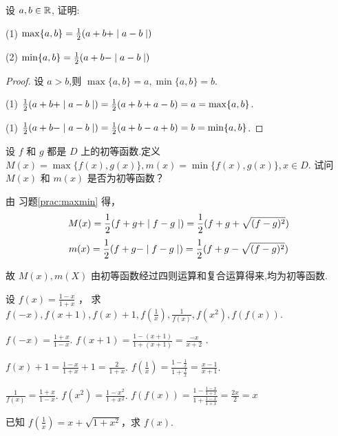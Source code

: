 \chapterhomework

\begin{practice}
    设 $a,b\in \mathbb{R}$, 证明:

    (1) $\max \{a,b\} = \frac{1}{2}(a+b+\mid a-b \mid)$

    (2) $\min \{a,b\} = \frac{1}{2}(a+b-\mid a-b \mid)$
\end{practice}

\begin{proof}
    设 $a>b$,则 $\max \{a,b\}=a,\min \{a,b\} =b$.

    (1) $\frac{1}{2}(a+b+\mid a-b \mid)=\frac{1}{2}(a+b+a-b)=a=\max \{a,b\}$.

    (1) $\frac{1}{2}(a+b-\mid a-b \mid)=\frac{1}{2}(a+b-a+b)=b=\min \{a,b\}$.
\end{proof}

\begin{practice}\label{prac:maxmin}
    设 $f$ 和 $g$ 都是 $D$ 上的初等函数.定义 $M(x)=\max \{f(x),g(x)\},m(x)=\min \{f(x),g(x)\},x\in D$. 试问 $M(x)$ 和 $m(x)$ 是否为初等函数？
\end{practice}

\begin{solve}
    由 习题\ref{prac:maxmin} 得，
\[
    M(x)=\frac{1}{2}(f+g+\mid f-g \mid) = \frac{1}{2}(f+g+\sqrt{(f-g)^2})
\]
\[
    m(x)=\frac{1}{2}(f+g-\mid f-g \mid) = \frac{1}{2}(f+g-\sqrt{(f-g)^2})
\]

故 $M(x),m(X)$ 由初等函数经过四则运算和复合运算得来,均为初等函数.
\end{solve}

\begin{practice}
    设 $f(x)=\frac{1-x}{1+x}$ ， 求 $f(-x),f(x+1),f(x)+1,f(\frac{1}{x}),\frac{1}{f(x)},f(x^2),f(f(x))$.
\end{practice}

\begin{solve}
    $f(-x) = \frac{1+x}{1-x}$. $f(x+1)=\frac{1-(x+1)}{1+(x+1)}=\frac{-x}{x+2}$ .

    $f(x)+1=\frac{1-x}{1+x}+1=\frac{2}{1+x}$. $f(\frac{1}{x})=\frac{1-\frac{1}{x}}{1+\frac{1}{x}}=\frac{x-1}{x+1}$.

    $\frac{1}{f(x)}=\frac{1+x}{1-x}$. $f(x^2)=\frac{1-x^2}{1+x^2}$. $f(f(x))=\frac{1-\frac{1-x}{1+x}}{1+\frac{1-x}{1+x}}=\frac{2x}{2}=x$
\end{solve}

\begin{practice}
    已知 $f(\frac{1}{x})=x+\sqrt{1+x^2}$，求 $f(x)$.
\end{practice}

